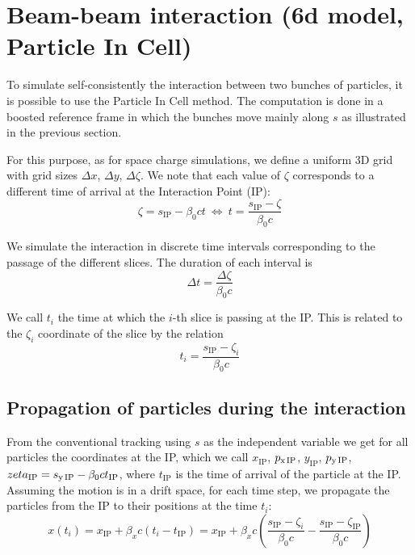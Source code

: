 \section{Beam-beam interaction (6d model, Particle In Cell)}

To simulate self-consistently the interaction between two bunches of particles, it is possible to use the Particle In Cell method. The computation is done in a boosted reference frame in which the bunches move mainly along $s$ as illustrated in the previous section.

For this purpose, as for space charge simulations, we define a uniform 3D grid with grid sizes $\Delta x$, $\Delta y$,  $\Delta \zeta$. We note that each value of $\zeta$ corresponds to a different time of arrival at the Interaction Point (IP):
\begin{equation}
\zeta = s_\text{IP} - \beta_0 c t 
\ \Leftrightarrow \ 
t = \frac{s_\text{IP} - \zeta}{\beta_0 c}
\end{equation}

We simulate the interaction in discrete time intervals corresponding to the passage of the different slices. The duration of each interval is
\begin{equation}
\Delta t = \frac{\Delta \zeta}{\beta_0 c}
\label{eq:dtbbpic}
\end{equation}

We call $t_i$ the time at which the $i$-th slice is passing at the IP. This is related to the $\zeta_i$ coordinate of the slice by the relation
\begin{equation}
t_i = \frac{s_\text{IP} - \zeta_i}{\beta_0 c}
\end{equation}

\subsection{Propagation of particles during the interaction}
\label{sec:prop_bb_pic}

From the conventional tracking using $s$ as the independent variable we get for all particles the coordinates at the IP, which we call $x_\text{IP}$, $p_\text{x\,IP}$, $y_\text{IP}$, $p_\text{y\,IP}$, $zeta_\text{IP} = s_\text{y\,IP} - \beta_0 c t_\text{IP} $, where $t_\text{IP} $ is the time of arrival of the particle at the IP. Assuming the motion is in a drift space, for each time step, we propagate the particles from the IP to their positions at the time $t_i$:
\begin{equation}
x \left( t_i \right) = x_\text{IP} + \beta_x c\left( t_i -t_\text{IP}\right)
=
x_\text{IP} + \beta_x c\left( \frac{s_\text{IP} - \zeta_i}{\beta_0 c} -\frac{s_\text{IP} - \zeta_\text{IP}}{\beta_0 c}\right)
\end{equation}

